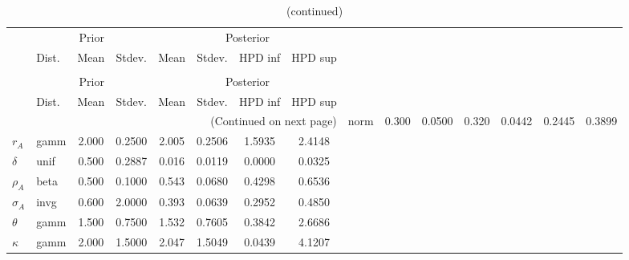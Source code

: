 
\begin{center}
\begin{longtable}{llcccccc} 
\caption{Results from Metropolis-Hastings (parameters)}
 \label{Table:MHPosterior:1}\\
\toprule 
  & \multicolumn{3}{c}{Prior}  &  \multicolumn{4}{c}{Posterior} \\
  \cmidrule(r{.75em}){2-4} \cmidrule(r{.75em}){5-8}
  & Dist. & Mean  & Stdev. & Mean & Stdev. & HPD inf & HPD sup\\
\midrule \endfirsthead 
\caption{(continued)}\\\toprule 
  & \multicolumn{3}{c}{Prior}  &  \multicolumn{4}{c}{Posterior} \\
  \cmidrule(r{.75em}){2-4} \cmidrule(r{.75em}){5-8}
  & Dist. & Mean  & Stdev. & Mean & Stdev. & HPD inf & HPD sup\\
\midrule \endhead 
\bottomrule \multicolumn{8}{r}{(Continued on next page)} \endfoot 
\bottomrule \endlastfoot 
${\alpha}$ & norm &   0.300 & 0.0500 &   0.320& 0.0442 &  0.2445 &  0.3899 \\ 
${r_{A}}$ & gamm &   2.000 & 0.2500 &   2.005& 0.2506 &  1.5935 &  2.4148 \\ 
${\delta}$ & unif &   0.500 & 0.2887 &   0.016& 0.0119 &  0.0000 &  0.0325 \\ 
${\rho_A}$ & beta &   0.500 & 0.1000 &   0.543& 0.0680 &  0.4298 &  0.6536 \\ 
${\sigma_A}$ & invg &   0.600 & 2.0000 &   0.393& 0.0639 &  0.2952 &  0.4850 \\ 
${\theta}$ & gamm &   1.500 & 0.7500 &   1.532& 0.7605 &  0.3842 &  2.6686 \\ 
${\kappa}$ & gamm &   2.000 & 1.5000 &   2.047& 1.5049 &  0.0439 &  4.1207 \\ 
\end{longtable}
 \end{center}
